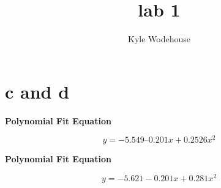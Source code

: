 \documentclass{article}
\title{\bfseries lab 1}
\author{Kyle Wodehouse}
\begin{document}
\maketitle


\section*{c and d}

\bfseries 
\centering
Polynomial Fit Equation

\[
    y = -5.549 – 0.201x + 0.2526x^2
\]

\bfseries 
\centering
Polynomial Fit Equation

\[
    y = -5.621 - 0.201x + 0.281x^2
\]
\end{document}
